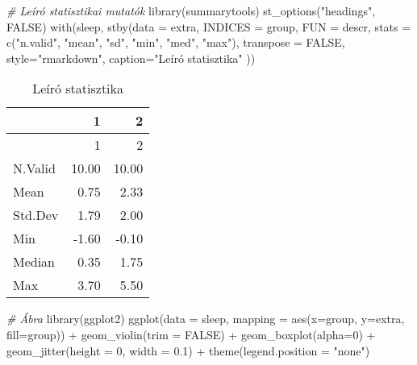 \documentclass[
]{book}
\newenvironment{Shaded}{\begin{snugshade}}{\end{snugshade}}
\newcommand{\AttributeTok}[1]{\textcolor[rgb]{0.77,0.63,0.00}{#1}}
\newcommand{\CommentTok}[1]{\textcolor[rgb]{0.56,0.35,0.01}{\textit{#1}}}
\newcommand{\ConstantTok}[1]{\textcolor[rgb]{0.00,0.00,0.00}{#1}}
\newcommand{\DecValTok}[1]{\textcolor[rgb]{0.00,0.00,0.81}{#1}}
\newcommand{\FloatTok}[1]{\textcolor[rgb]{0.00,0.00,0.81}{#1}}
\newcommand{\FunctionTok}[1]{\textcolor[rgb]{0.00,0.00,0.00}{#1}}
\newcommand{\NormalTok}[1]{#1}
\newcommand{\SpecialCharTok}[1]{\textcolor[rgb]{0.00,0.00,0.00}{#1}}
\newcommand{\StringTok}[1]{\textcolor[rgb]{0.31,0.60,0.02}{#1}}
\begin{document}
\begin{Shaded}
\begin{Highlighting}[]
\CommentTok{\# Leíró statisztikai mutatók}
\FunctionTok{library}\NormalTok{(summarytools)}
\FunctionTok{st\_options}\NormalTok{(}\StringTok{"headings"}\NormalTok{, }\ConstantTok{FALSE}\NormalTok{)}
\FunctionTok{with}\NormalTok{(sleep, }
           \FunctionTok{stby}\NormalTok{(}\AttributeTok{data =}\NormalTok{ extra, }
                \AttributeTok{INDICES =}\NormalTok{ group, }
                \AttributeTok{FUN =}\NormalTok{ descr,}
                \AttributeTok{stats =} \FunctionTok{c}\NormalTok{(}\StringTok{"n.valid"}\NormalTok{, }\StringTok{"mean"}\NormalTok{, }\StringTok{"sd"}\NormalTok{, }
                          \StringTok{"min"}\NormalTok{, }\StringTok{"med"}\NormalTok{, }\StringTok{"max"}\NormalTok{),}
                \AttributeTok{transpose =} \ConstantTok{FALSE}\NormalTok{,}
                \AttributeTok{style=}\StringTok{"rmarkdown"}\NormalTok{,}
                \AttributeTok{caption=}\StringTok{"Leíró statisztika"}
\NormalTok{                )) }
\end{Highlighting}
\end{Shaded}

\begin{longtable}[]{@{}lrr@{}}
\caption{Leíró statisztika}\tabularnewline
\toprule
& 1 & 2 \\
\midrule
\endfirsthead
\toprule
& 1 & 2 \\
\midrule
\endhead
N.Valid & 10.00 & 10.00 \\
Mean & 0.75 & 2.33 \\
Std.Dev & 1.79 & 2.00 \\
Min & -1.60 & -0.10 \\
Median & 0.35 & 1.75 \\
Max & 3.70 & 5.50 \\
\bottomrule
\end{longtable}

\begin{Shaded}
\begin{Highlighting}[]
\CommentTok{\# Ábra}
\FunctionTok{library}\NormalTok{(ggplot2)}
\FunctionTok{ggplot}\NormalTok{(}\AttributeTok{data =}\NormalTok{ sleep, }\AttributeTok{mapping =} \FunctionTok{aes}\NormalTok{(}\AttributeTok{x=}\NormalTok{group, }\AttributeTok{y=}\NormalTok{extra, }\AttributeTok{fill=}\NormalTok{group)) }\SpecialCharTok{+} 
  \FunctionTok{geom\_violin}\NormalTok{(}\AttributeTok{trim =} \ConstantTok{FALSE}\NormalTok{) }\SpecialCharTok{+} 
  \FunctionTok{geom\_boxplot}\NormalTok{(}\AttributeTok{alpha=}\DecValTok{0}\NormalTok{) }\SpecialCharTok{+} 
  \FunctionTok{geom\_jitter}\NormalTok{(}\AttributeTok{height =} \DecValTok{0}\NormalTok{, }\AttributeTok{width =} \FloatTok{0.1}\NormalTok{) }\SpecialCharTok{+} 
  \FunctionTok{theme}\NormalTok{(}\AttributeTok{legend.position =} \StringTok{"none"}\NormalTok{) }
\end{Highlighting}
\end{Shaded}
\end{document}
